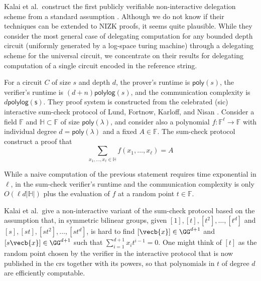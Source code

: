 

Kalai et al.~construct the first publicly verifiable non-interactive delegation scheme from a standard assumption \cite{EPRINT:KalPanYan18}. Although we do not know if their techniques can be extended to NIZK proofs, it seems quite plausible. While they consider the most general case of delegating computation for any bounded depth circuit (uniformly generated by a log-space turing machine) through a delegating scheme for the universal circuit, we concentrate on their results for delegating computation of a single circuit encoded in the reference string. %

For a circuit $C$ of size $s$ and depth $d$, the prover's runtime is $\mathsf{poly}(s)$, the verifier's runtime is $(d+n)\mathsf{polylog}(s)$, and the communication complexity is $d\mathsf{polylog(s)}$. They proof system is constructed from the celebrated (sic) interactive sum-check protocol of Lund, Fortnow, Karloff, and Nisan \cite{FOCS:LFKN90}. Consider a field $\mathbb{F}$ and $\mathbb{H}\subset\mathbb{F}$ of size $\mathsf{poly(\lambda)}$, and consider also a polynomial $f:\mathbb{F}^\ell\to\mathbb{F}$ with individual degree $d=\mathsf{poly(\lambda)}$ and a fixed $A\in\mathbb{F}$. The sum-check protocol construct a proof that
$$
\sum_{x_1,\ldots,x_\ell\in\mathbb{H}} f(x_1,\ldots,x_\ell) = A
$$

While a naive computation of the previous statement requires time exponential in $\ell$, in the sum-check verifier's runtime and the communication complexity is only $O(\ell d|\mathbb{H}|)$ plus the evaluation of $f$ at a random point $t\in\mathbb{F}$. 

Kalai et al.~give a non-interactive variant of the sum-check protocol based on the assumption that, in symmetric bilinear groups, given $[1],[t],[t^2],\ldots,[t^d]$ and $[s],[st],[st^2],\ldots,[st^d]$, is hard to find $[\vecb{x}]\in\GG^{d+1}$ and $[s\vecb{x}]\in\GG^{d+1}$ such that $\sum_{i=1}^{d+1} x_it^{i-1} = 0$. One might think of $[t]$ as the random point chosen by the verifier in the interactive protocol that is now published in the crs together with its powers, so that polynomials in $t$ of degree $d$ are efficiently computable.

